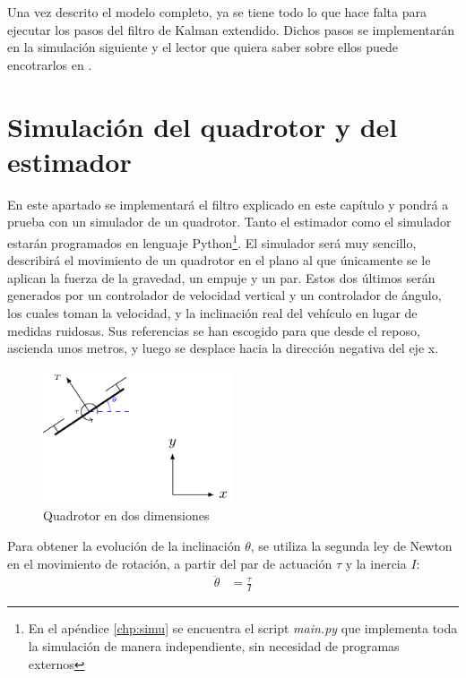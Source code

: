 Una vez descrito el modelo completo, ya se tiene todo lo que hace falta para ejecutar los pasos del filtro de Kalman extendido. Dichos pasos se implementarán en la simulación siguiente y el lector que quiera saber sobre ellos puede encotrarlos en \cite{arias2019control}.


\section{Simulación del quadrotor y del estimador}
En este apartado se implementará el filtro explicado en este capítulo y pondrá a prueba con un simulador de un quadrotor. Tanto el estimador como el simulador estarán programados en lenguaje Python\footnote{En el apéndice \ref{chp:simu} se encuentra el script \textit{main.py} que implementa toda la simulación de manera independiente, sin necesidad de programas externos}. El simulador será muy sencillo, describirá el movimiento de un quadrotor en el plano al que únicamente se le aplican la fuerza de la gravedad, un empuje y un par. Estos dos últimos serán generados por un controlador de velocidad vertical y un controlador de ángulo, los cuales toman la velocidad, y la inclinación real del vehículo en lugar de medidas ruidosas. Sus referencias se han escogido para que desde el reposo, ascienda unos metros, y luego se desplace hacia la dirección negativa del eje x. 


\begin{figure}
\includegraphics[width=0.5\textwidth]{estimador_px4/tikz/quadrotor_2d}
\caption{Quadrotor en dos dimensiones}
\label{fig:model}
\end{figure}

Para obtener la evolución de la inclinación $\theta$, se utiliza la segunda ley de Newton en el movimiento de rotación, a partir del par de actuación $\tau$ y la inercia $I$:
\begin{align}
        \ddot{\theta} &= \frac{\tau}{I} 
\end{align}

